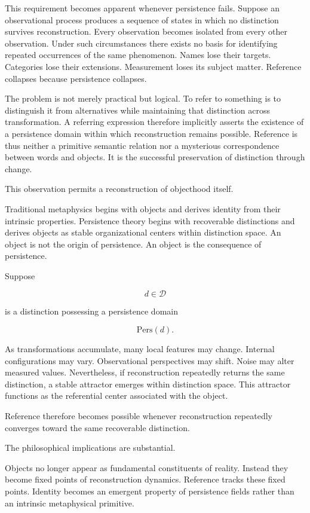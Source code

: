 \documentclass[12pt,oneside]{article}
\theoremstyle{definition}
\begin{document}
This requirement becomes apparent whenever persistence fails. Suppose an observational process produces a sequence of states in which no distinction survives reconstruction. Every observation becomes isolated from every other observation. Under such circumstances there exists no basis for identifying repeated occurrences of the same phenomenon. Names lose their targets. Categories lose their extensions. Measurement loses its subject matter. Reference collapses because persistence collapses.

The problem is not merely practical but logical. To refer to something is to distinguish it from alternatives while maintaining that distinction across transformation. A referring expression therefore implicitly asserts the existence of a persistence domain within which reconstruction remains possible. Reference is thus neither a primitive semantic relation nor a mysterious correspondence between words and objects. It is the successful preservation of distinction through change.

This observation permits a reconstruction of objecthood itself.

Traditional metaphysics begins with objects and derives identity from their intrinsic properties. Persistence theory begins with recoverable distinctions and derives objects as stable organizational centers within distinction space. An object is not the origin of persistence. An object is the consequence of persistence.

Suppose

\[
d \in \mathcal D
\]

is a distinction possessing a persistence domain

\[
\mathrm{Pers}(d).
\]

As transformations accumulate, many local features may change. Internal configurations may vary. Observational perspectives may shift. Noise may alter measured values. Nevertheless, if reconstruction repeatedly returns the same distinction, a stable attractor emerges within distinction space. This attractor functions as the referential center associated with the object.

Reference therefore becomes possible whenever reconstruction repeatedly converges toward the same recoverable distinction.

The philosophical implications are substantial.

Objects no longer appear as fundamental constituents of reality. Instead they become fixed points of reconstruction dynamics. Reference tracks these fixed points. Identity becomes an emergent property of persistence fields rather than an intrinsic metaphysical primitive.
\end{document}
